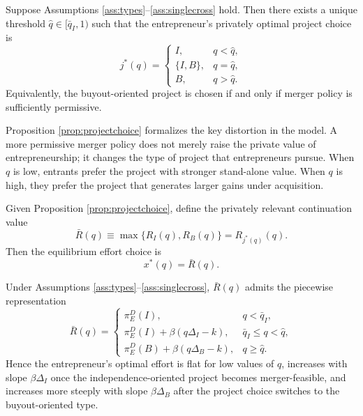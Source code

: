 \begin{proposition}\label{prop:projectchoice}
Suppose Assumptions \ref{ass:types}--\ref{ass:singlecross} hold.
Then there exists a unique threshold \(\hat q \in [\bar q_I,1)\) such that the entrepreneur's privately optimal project choice is
\begin{equation}
    j^*(q)
    =
    \begin{cases}
        I, & q<\hat q, \\
        \{I,B\}, & q=\hat q, \\
        B, & q>\hat q.
    \end{cases}
\end{equation}
Equivalently, the buyout-oriented project is chosen if and only if merger policy is sufficiently permissive.
\end{proposition}

Proposition \ref{prop:projectchoice} formalizes the key distortion in the model.
A more permissive merger policy does not merely raise the private value of entrepreneurship; it changes the type of project that entrepreneurs pursue.
When \(q\) is low, entrants prefer the project with stronger stand-alone value.
When \(q\) is high, they prefer the project that generates larger gains under acquisition.

Given Proposition \ref{prop:projectchoice}, define the privately relevant continuation value
\begin{equation}\label{eq:Rbar}
    \bar R(q) \equiv \max\{R_I(q),R_B(q)\} = R_{j^*(q)}(q).
\end{equation}
Then the equilibrium effort choice is
\begin{equation}\label{eq:xstar}
    x^*(q)=\bar R(q).
\end{equation}

Under Assumptions \ref{ass:types}--\ref{ass:singlecross}, \(\bar R(q)\) admits the piecewise representation
\begin{equation}\label{eq:Rbarpiece}
    \bar R(q)
    =
    \begin{cases}
        \pi_E^D(I), &
        q < \bar q_I, \\
        \pi_E^D(I)+\beta(q\Delta_I-k), &
        \bar q_I \le q < \hat q, \\
        \pi_E^D(B)+\beta(q\Delta_B-k), &
        q \ge \hat q.
    \end{cases}
\end{equation}
Hence the entrepreneur's optimal effort is flat for low values of \(q\), increases with slope \(\beta\Delta_I\) once the independence-oriented project becomes merger-feasible, and increases more steeply with slope \(\beta\Delta_B\) after the project choice switches to the buyout-oriented type.

